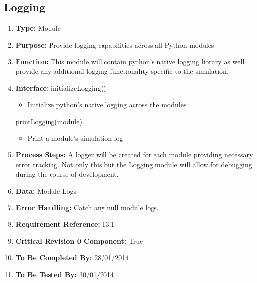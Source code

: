 \documentclass[paper=letter, fontsize=10pt]{scrartcl}
\numberwithin{equation}{section}		%
\numberwithin{figure}{section}			%
\numberwithin{table}{section}				%
\begin{document}
\subsection{Logging}
\begin{enumerate}[]
	\item \textbf{Type:} Module
	\item \textbf{Purpose:} Provide logging capabilities across all Python modules
	\item \textbf{Function:} This module will contain python's native logging library as well provide any additional logging functionality specific to the simulation.
	\item \textbf{Interface:}
	initializeLogging()
		\begin{itemize}
			\item Initialize python's native logging across the modules
		\end{itemize}
	printLogging(module)
		\begin{itemize}
			\item Print a module's simulation log
		\end{itemize}
	\item \textbf{Process Steps:} A logger will be created for each module providing necessary error tracking.  Not only this but the Logging module will allow for debugging during the course of development.
	\item \textbf{Data:} Module Logs
	\item \textbf{Error Handling:} Catch any null module logs.
	\item \textbf{Requirement Reference:} 13.1
	\item \textbf{Critical Revision 0 Component:} True
	\item \textbf{To Be Completed By:} 28/01/2014
	\item \textbf{To Be Tested By:} 30/01/2014
\end{enumerate}
\end{document}
